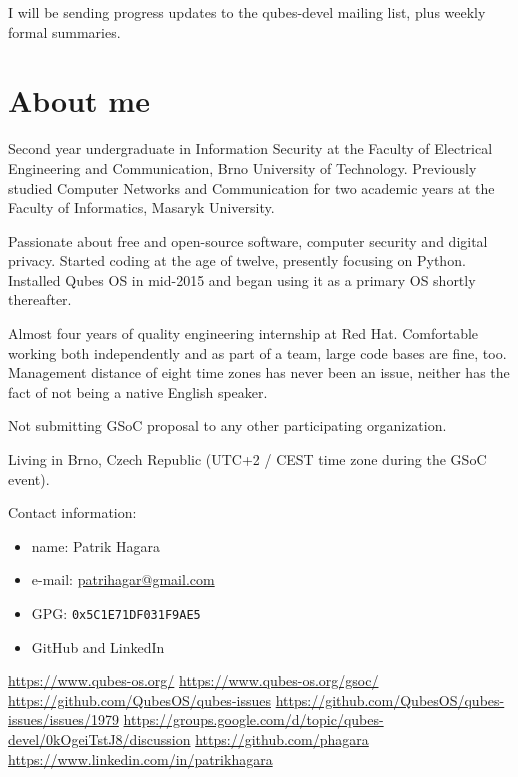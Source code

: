 \documentclass[10pt,a4paper,twocolumn]{article}
\begin{document}
I will be sending progress updates to the qubes-devel mailing list, plus weekly
formal summaries.


\section{About me}

Second year undergraduate in Information Security at the Faculty of Electrical
Engineering and Communication, Brno University of Technology.  Previously
studied Computer Networks and Communication for two academic years at the
Faculty of Informatics, Masaryk University.

Passionate about free and open-source software, computer security and digital
privacy. Started coding at the age of twelve, presently focusing on Python.
Installed Qubes OS in mid-2015 and began using it as a primary OS shortly
thereafter. 

Almost four years of quality engineering internship at Red Hat. Comfortable
working both independently and as part of a team, large code bases are fine,
too. Management distance of eight time zones has never been an issue, neither
has the fact of not being a native English speaker.

Not submitting GSoC proposal to any other participating organization.

Living in Brno, Czech Republic (UTC+2 / CEST time zone during the GSoC event).

Contact information:
\begin{itemize}
  \item name: Patrik Hagara
  \item e-mail: \href{mailto:patrihagar@gmail.com}{patrihagar@gmail.com}
  \item GPG: \texttt{0x5C1E71DF031F9AE5}
  \item GitHub \cite{my-github} and LinkedIn \cite{my-linkedin}
\end{itemize}


\def\bibfont{\footnotesize}
\begin{thebibliography}{9}
    \url{https://www.qubes-os.org/}
    \url{https://www.qubes-os.org/gsoc/}
    \url{https://github.com/QubesOS/qubes-issues}
    \url{https://github.com/QubesOS/qubes-issues/issues/1979}
    \url{https://groups.google.com/d/topic/qubes-devel/0kOgeiTstJ8/discussion}
    \url{https://github.com/phagara}
    \url{https://www.linkedin.com/in/patrikhagara}
\end{thebibliography}
\end{document}
